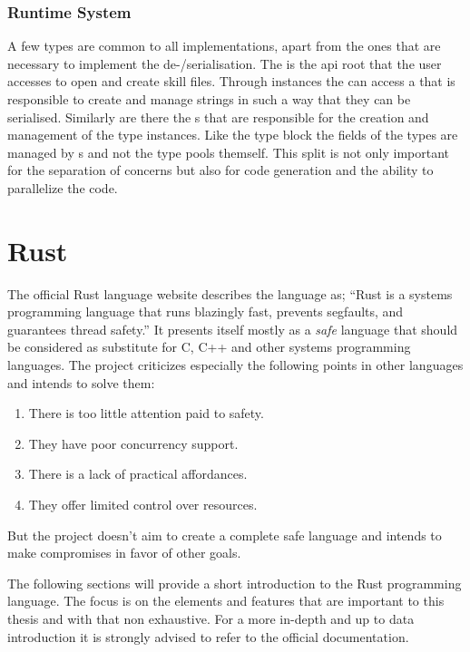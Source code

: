 \documentclass[thesis]{subfiles}
\begin{document}
    \subsubsection{Runtime System}
      A few types are common to all implementations, apart from the ones that are necessary to implement the de-/serialisation.
      The  is the \gls{api} root that the user accesses to open and create \gls{skill} files.
      Through  instances the can access a  that is responsible to create and manage strings in such a way that they can be serialised.
      Similarly are there the s that are responsible for the creation and management of the type instances.
      Like the type block the fields of the types are managed by s and not the type pools themself.
      This split is not only important for the separation of concerns but also for code generation and the ability to parallelize the code.

\section{Rust}\label{sec:rust}
  The official Rust language website describes the language as;
  \enquote{Rust is a systems programming language that runs blazingly fast, prevents segfaults, and guarantees thread safety.}\autocite{rust-org}
  It presents itself mostly as a \emph{safe} language that should be considered as substitute for C, C++ and other systems programming languages.
  The project criticizes especially the following points in other languages and intends to solve them\autocite{rust-org}:
  \begin{enumerate}
    \item There is too little attention paid to safety.
    \item They have poor concurrency support.
    \item There is a lack of practical affordances.
    \item They offer limited control over resources.
  \end{enumerate}
  But the project doesn't aim to create a complete safe language and intends to make compromises in favor of other goals.

  The following sections will provide a short introduction to the Rust programming language.
  The focus is on the elements and features that are important to this thesis and with that non exhaustive.
  For a more in-depth and up to data introduction it is strongly advised to refer to the official documentation.
\end{document}
